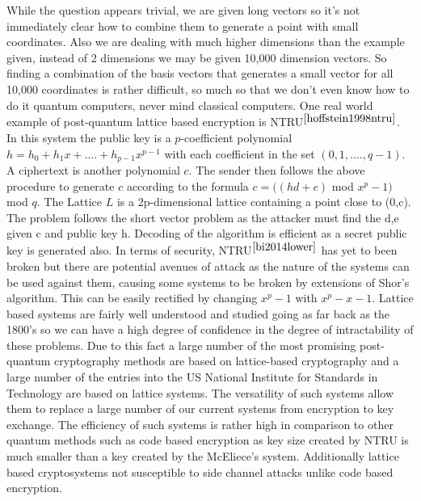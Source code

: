 \documentclass[10pt,a4paper]{IEEEtran}
\begin{document}
While the question appears trivial, we are given long vectors so it's not immediately clear how to combine them to generate a point with small coordinates. Also we are dealing with much higher dimensions than the example given, instead of 2 dimensions we may be given 10,000 dimension vectors. So finding a combination of the basis vectors that generates a small vector for all 10,000 coordinates is rather difficult, so much so that we don't even know how to do it quantum computers, never mind classical computers.
\newline
\newline
One real world example of post-quantum lattice based encryption is NTRU\(^{\cite{hoffstein1998ntru}}\). In this system the public key is a \(p\)-coefficient polynomial \( h = h_0 +h_1x+....+h_{p-1}x^{p-1} \) with each coefficient in the set \((0,1,....,q-1)\). A ciphertext is another polynomial \(c\). The sender then follows the above procedure to generate \(c\) according to the formula \(c =  ((hd + e) \) mod \(x^p-1)\) mod \( q\). The Lattice \(L\) is a 2p-dimensional lattice containing a point close to (0,c). The problem follows the short vector problem as the attacker must find the d,e given c and public key h. Decoding of the algorithm is efficient as a secret public key is generated also.
\newline
In terms of security, NTRU\(^{\cite{bi2014lower}}\) has yet to been broken but there are potential avenues of attack as the nature of the systems can be used against them, causing some systems to be broken by extensions of Shor's algorithm. This can be easily rectified by changing \(x^p-1\) with \(x^p-x-1\).
\newline
\newline
Lattice based systems are fairly well understood and studied going as far back as the 1800's so we can have a high degree of confidence in the degree of intractability of these problems. Due to this fact a large number of the most promising post-quantum cryptography methods are based on lattice-based cryptography and a large number of the entries into the US National Institute for Standards in Technology are based on lattice systems. The versatility of such systems allow them to replace a large number of our current systems from encryption to key exchange. The efficiency of such systems is rather high in comparison to other quantum methods such as code based encryption as key size created by NTRU is much smaller than a key created by the McEliece's system. Additionally lattice based cryptosystems not susceptible to side channel attacks unlike code based encryption.
\end{document}
